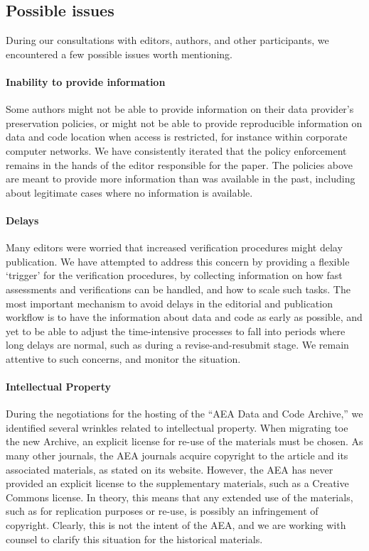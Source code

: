 \documentclass[AEJ]{AEA}
\begin{document}
\subsection{Possible issues}
During our consultations with editors, authors, and other participants, we encountered a few possible issues worth mentioning.

\paragraph{Inability to provide information} Some authors might not be able to provide information on their data provider's preservation policies, or might not be able to provide reproducible information on data and code location when access is restricted, for instance within corporate computer networks. We have consistently iterated that the policy enforcement remains in the hands of the editor responsible for the paper. The policies above are meant to provide more information than was available in the past, including about legitimate cases where no information is available.

\paragraph{Delays} Many editors were worried that increased verification procedures might delay publication. We have attempted to address this concern by providing a flexible `trigger' for the verification procedures, by collecting information on how fast assessments and verifications can be handled, and how to scale such tasks. The most important mechanism to avoid delays in the editorial and publication workflow is to have the information about data and code as early as possible, and yet to be able to adjust the time-intensive processes to fall into periods where long delays are normal, such as during a revise-and-resubmit stage. We remain attentive to such concerns, and monitor the situation.

\paragraph{Intellectual Property} During the negotiations for the hosting of the ``AEA Data and Code Archive,'' we identified several wrinkles related to intellectual property. When migrating toe the new Archive, an explicit license for re-use of the materials must be chosen. As many other journals, the AEA journals acquire copyright to the article and its associated materials, as stated on its website. However, the AEA has never provided an explicit license to the supplementary materials, such as a Creative Commons license. In theory, this means that any extended use of the materials, such as for replication purposes or re-use, is possibly an infringement of copyright. Clearly, this is not the intent of the AEA, and we are working with counsel to clarify this situation for the historical materials. 
\end{document}
